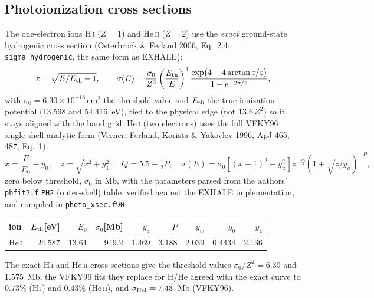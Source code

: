 \documentclass[english,a4paper]{my_memo}
\newcommand{\code}[1]{\texttt{#1}}
\begin{document}
\subsection{Photoionization cross sections}
\label{sec:photo}
The one-electron ions H\,\textsc{i} ($Z{=}1$) and He\,\textsc{ii}
($Z{=}2$) use the \emph{exact} ground-state hydrogenic cross section
(Osterbrock \& Ferland 2006, Eq.~2.4; \code{sigma\_hydrogenic}, the same
form as EXHALE):
\begin{equation}
  \varepsilon = \sqrt{E/E_{\rm th}-1},\qquad
  \sigma(E) = \frac{\sigma_0}{Z^2}\left(\frac{E_{\rm th}}{E}\right)^{4}
  \frac{\exp\!\big(4 - 4\arctan\varepsilon/\varepsilon\big)}
       {1 - e^{-2\pi/\varepsilon}},
  \label{eq:sighyd}
\end{equation}
with $\sigma_0 = 6.30{\times}10^{-18}\,\mathrm{cm^2}$ the threshold value
and $E_{\rm th}$ the true ionization potential (13.598 and 54.416~eV),
tied to the physical edge (not $13.6\,Z^2$) so it stays aligned with the
band grid.  He\,\textsc{i} (two electrons) uses the full VFKY96
single-shell analytic form (Verner, Ferland, Korista \& Yakovlev 1996, ApJ
465, 487, Eq.~1):
\begin{equation}
  x = \frac{E}{E_0} - y_0,\quad z = \sqrt{x^2 + y_1^2},\quad
  Q = 5.5 - \tfrac{1}{2}P,\quad
  \sigma(E) = \sigma_0\left[(x-1)^2 + y_w^2\right]
  z^{-Q}\left(1 + \sqrt{z/y_a}\right)^{-P},
  \label{eq:vfky}
\end{equation}
zero below threshold, $\sigma_0$ in Mb, with the parameters parsed from the
authors' \code{phfit2.f} \code{PH2} (outer-shell) table, verified against
the EXHALE implementation, and compiled in \code{photo\_xsec.f90}:

\begin{center}\small
\begin{tabular}{lrrrrrrrr}
\toprule
ion & $E_{\rm th}$[eV] & $E_0$ & $\sigma_0$[Mb] & $y_a$ & $P$ & $y_w$ & $y_0$ & $y_1$ \\
\midrule
He\,\textsc{i}  & 24.587 & 13.61  & 949.2 & 1.469 & 3.188 & 2.039 & 0.4434 & 2.136 \\
\bottomrule
\end{tabular}
\end{center}
The exact H\,\textsc{i} and He\,\textsc{ii} cross sections give the
threshold values $\sigma_0/Z^2 = 6.30$ and $1.575$~Mb; the VFKY96 fits they
replace for H/He agreed with the exact curve to $0.73\%$ (H\,\textsc{i})
and $0.43\%$ (He\,\textsc{ii}), and $\sigma_{\rm HeI} = 7.43$~Mb (VFKY96).
\end{document}
